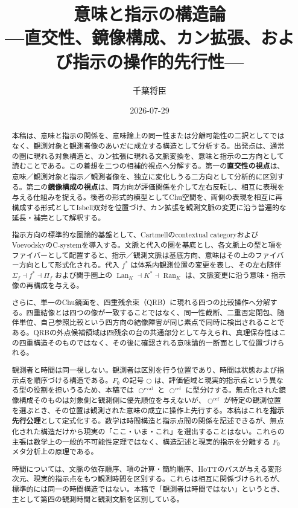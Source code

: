 \documentclass[a4paper,11pt]{ltjsarticle}
\title{意味と指示の構造論\\
{\large ---直交性、鏡像構成、カン拡張、および指示の操作的先行性---}}
\author{千葉将臣}
\date{2026-07-29}
\theoremstyle{definition}
\theoremstyle{plain}
\newcommand{\CircleRef}{\bigcirc^{\mathrm{ref}}}
\newcommand{\CircleEval}{\bigcirc^{\mathrm{eval}}}
\newcommand{\Lan}{\operatorname{Lan}}
\newcommand{\Ran}{\operatorname{Ran}}
\begin{document}
\maketitle

\begin{abstract}
本稿は、意味と指示の関係を、意味論上の同一性または分離可能性の二択としてではなく、観測対象と観測者像のあいだに成立する構造として分析する。出発点は、通常の圏に現れる対象構造と、カン拡張に現れる文脈変換を、意味と指示の二方向として読むことである。この着想を二つの相補的視点へ分解する。第一の\textbf{直交性の視点}は、意味／観測対象と指示／観測者像を、独立に変化しうる二方向として分析的に区別する。第二の\textbf{鏡像構成の視点}は、両方向が評価関係を介して左右反転し、相互に表現を与える仕組みを捉える。後者の形式的模型としてChu空間を、両側の表現を相互に再構成する形式としてIsbell双対を位置づけ、カン拡張を観測文脈の変更に沿う普遍的な延長・補完として解釈する。

指示方向の標準的な圏論的基盤として、Cartmellのcontextual categoryおよびVoevodskyのC-systemを導入する。文脈と代入の圏を基底とし、各文脈上の型と項をファイバーとして配置すると、指示／観測文脈は基底方向、意味はその上のファイバー方向として形式化される。代入 $f^*$ は体系内観測位置の変更を表し、その左右随伴 $\Sigma_f\dashv f^*\dashv\Pi_f$ および関手圏上の $\Lan_K\dashv K^*\dashv\Ran_K$ は、文脈変更に沿う意味・指示像の再構成を与える。

さらに、単一のChu鏡面を、四重残余束（QRB）に現れる四つの比較操作へ分解する。四重結像とは四つの像が一致することではなく、同一性截断、二重否定閉包、随伴単位、自己参照比較という四方向の結像障害が同じ素点で同時に検出されることである。QRBの外点候補領域は四残余の台の共通部分として与えられ、真理保存性はこの四重構造そのものではなく、その後に確認される意味論的一断面として位置づけられる。

観測者と時間は同一視しない。観測者は区別を行う位置であり、時間は状態および指示点を順序づける構造である。$F_0$ の記号 $\bigcirc$ は、評価値域と現実的指示点という異なる型の役割を担いうるため、本稿では $\CircleEval$ と $\CircleRef$ に型分けする。無点化された鏡像構成そのものは対象側と観測側に優先順位を与えないが、$\CircleRef$ が特定の観測位置を選ぶとき、その位置は観測された意味の成立に操作上先行する。本稿はこれを\textbf{指示先行公理}として定式化する。数学は時間構造と指示点間の関係を記述できるが、無点化された構造だけから現実の「ここ・いま・これ」を選出することはない。これらの主張は数学上の一般的不可能性定理ではなく、構造記述と現実的指示を分離する $F_0$ メタ分析上の原理である。

時間については、文脈の依存順序、項の計算・簡約順序、HoTTのパスが与える変形次元、現実的指示点をもつ観測時間を区別する。これらは相互に関係づけられるが、標準的には同一の時間構造ではない。本稿で「観測者は時間ではない」というとき、主として第四の観測時間と観測文脈を区別している。
\end{abstract}
\end{document}
